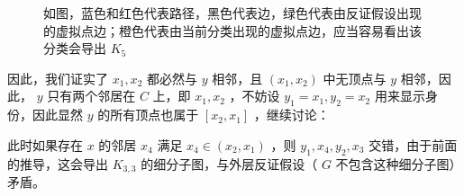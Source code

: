 \documentclass[11pt, a4paper]{ctexart}
\begin{document}
\begin{figure}[H]
    \caption{如图，蓝色和红色代表路径，黑色代表边，绿色代表由反证假设出现的虚拟点边；橙色代表由当前分类出现的虚拟点边，应当容易看出该分类会导出 $K_5$}
\end{figure}

因此，我们证实了 $x_1,x_2$ 都必然与 $y$ 相邻，且 $(x_1,x_2)$ 中无顶点与 $y$ 相邻，因此， $y$ 只有两个邻居在 $C$ 上，即 $x_1,x_2$ ，不妨设 $y_1=x_1,y_2=x_2$ 用来显示身份，因此显然 $y$ 的所有顶点也属于 $[x_2,x_1]$ ，继续讨论：

此时如果存在 $x$ 的邻居 $x_4$ 满足 $x_4\in(x_2,x_1)$ ，则 $y_1,x_4,y_2,x_3$ 交错，由于前面的推导，这会导出 $K_{3,3}$ 的细分子图，与外层反证假设（ $G$ 不包含这种细分子图）矛盾。
\end{document}

